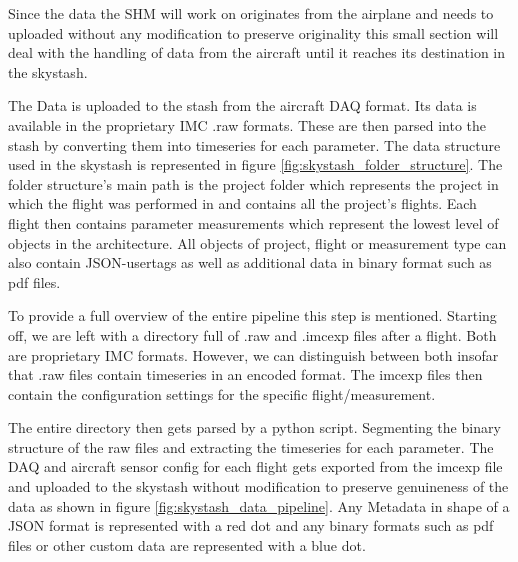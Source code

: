 
Since the data the SHM will work on originates from the airplane and needs to uploaded without any modification to preserve originality this small section will deal with the handling of data from the aircraft until it reaches its destination in the skystash.

The Data is uploaded to the stash from the aircraft DAQ format. Its data is available in the proprietary IMC .raw formats. These are then parsed into the stash by converting them into timeseries for each parameter. The data structure used in the skystash is represented in figure \ref{fig:skystash_folder_structure}. The folder structure's main path is the project folder which represents the project in which the flight was performed in and contains all the project's flights. Each flight then contains parameter measurements which represent the lowest level of objects in the architecture. All objects of project, flight or measurement type can also contain JSON-usertags as well as additional data in binary format such as pdf files.




To provide a full overview of the entire pipeline this step is mentioned. Starting off, we are left with a directory full of .raw and .imcexp files after a flight. Both are proprietary IMC formats. However, we can distinguish between both insofar that .raw files contain timeseries in an encoded format. The imcexp files then contain the configuration settings for the specific flight/measurement.

The entire directory then gets parsed by a python script. Segmenting the binary structure of the raw files and extracting the timeseries for each parameter. The DAQ and aircraft sensor config for each flight gets exported from the imcexp file and uploaded to the skystash without modification to preserve genuineness of the data as shown in figure \ref{fig:skystash_data_pipeline}. Any Metadata in shape of a JSON format is represented with a red dot and any binary formats such as pdf files or other custom data are represented with a blue dot.

